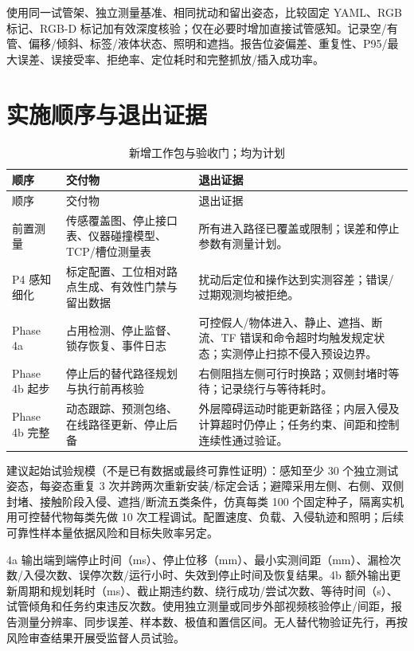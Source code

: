 使用同一试管架、独立测量基准、相同扰动和留出姿态，比较固定 YAML、RGB 标记、RGB-D 标记加有效深度核验；仅在必要时增加直接试管感知。记录空/有管、偏移/倾斜、标签/液体状态、照明和遮挡。报告位姿偏差、重复性、P95/最大误差、误接受率、拒绝率、定位耗时和完整抓放/插入成功率。

\section{实施顺序与退出证据}

\begingroup
\small
\begin{longtable}{L{2.4cm}L{5.7cm}L{6.4cm}}
\caption{新增工作包与验收门；均为计划}\\
\toprule
顺序 & 交付物 & 退出证据 \\
\midrule
\endfirsthead
\toprule
顺序 & 交付物 & 退出证据 \\
\midrule
\endhead
前置测量 & 传感覆盖图、停止接口表、仪器碰撞模型、TCP/槽位测量表 & 所有进入路径已覆盖或限制；误差和停止参数有测量计划。 \\
P4 感知细化 & 标定配置、工位相对路点生成、有效性门禁与留出数据 & 扰动后定位和操作达到实测容差；错误/过期观测均被拒绝。 \\
Phase 4a & 占用检测、停止监督、锁存恢复、事件日志 & 可控假人/物体进入、静止、遮挡、断流、TF 错误和命令超时均触发规定状态；实测停止扫掠不侵入预设边界。 \\
Phase 4b 起步 & 停止后的替代路径规划与执行前再核验 & 右侧阻挡左侧可行时换路；双侧封堵时等待；记录绕行与等待耗时。 \\
Phase 4b 完整 & 动态跟踪、预测包络、在线路径更新、停止后备 & 外层障碍运动时能更新路径；内层入侵及计算超时仍停止；任务约束、间距和控制连续性通过验证。 \\
\bottomrule
\end{longtable}
\endgroup

建议起始试验规模（不是已有数据或最终可靠性证明）：感知至少 30 个独立测试姿态，每姿态重复 3 次并跨两次重新安装/标定会话；避障采用左侧、右侧、双侧封堵、接触阶段入侵、遮挡/断流五类条件，仿真每类 100 个固定种子，隔离实机用可控替代物每类先做 10 次工程调试。配置速度、负载、入侵轨迹和照明；后续可靠性样本量依据风险和目标失败率另定。

4a 输出端到端停止时间（ms）、停止位移（mm）、最小实测间距（mm）、漏检次数/入侵次数、误停次数/运行小时、失效到停止时间及恢复结果。4b 额外输出更新周期和规划耗时（ms）、截止期违约数、绕行成功/尝试次数、等待时间（s）、试管倾角和任务约束违反次数。使用独立测量或同步外部视频核验停止/间距，报告测量分辨率、同步误差、样本数、极值和置信区间。无人替代物验证先行，再按风险审查结果开展受监督人员试验。
